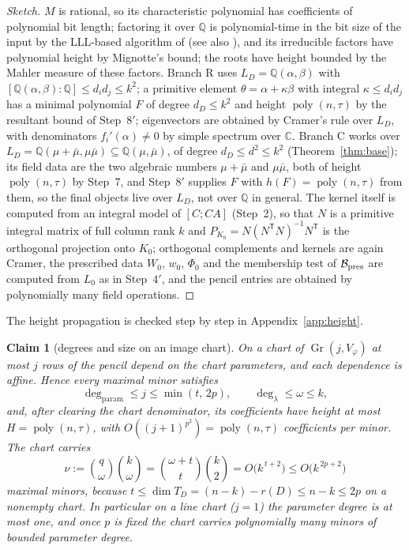 \documentclass[journal]{IEEEtran}
\theoremstyle{plainn}
\newtheorem{claim}[thm]{Claim}
\theoremstyle{remark}
\newcommand{\Gr}{\operatorname{Gr}}
\newcommand{\poly}{\operatorname{poly}}
\begin{document}
\begin{proof}[Sketch]
$M$ is rational, so its characteristic polynomial has coefficients of polynomial bit length; factoring it
over $\mathbb Q$ is polynomial-time in the bit size of the input by the LLL-based algorithm of \cite{lll82}
(see also \cite{cohen93}), and its irreducible factors have polynomial height by Mignotte's bound; the
roots have height bounded by the Mahler measure of these factors. Branch R uses $L_D=\mathbb Q(\alpha,\beta)$ with
$[\mathbb Q(\alpha,\beta):\mathbb Q]\le d_id_j\le k^2$; a primitive element $\theta=\alpha+\kappa\beta$ with integral
$\kappa\le d_id_j$ has a minimal polynomial $F$ of degree $d_D\le k^2$ and height $\poly(n,\tau)$ by the
resultant bound of Step~$8'$; eigenvectors are obtained by Cramer's rule over
$L_D$, with denominators $f_i'(\alpha)\ne0$ by simple spectrum over $\mathbb C$. Branch C works over
$L_D=\mathbb Q(\mu+\bar\mu,\mu\bar\mu)\subseteq\mathbb Q(\mu,\bar\mu)$, of degree $d_D\le d^2\le k^2$
(Theorem~\ref{thm:base}); its field data are the two algebraic numbers $\mu+\bar\mu$ and $\mu\bar\mu$,
both of height $\poly(n,\tau)$ by Step~7, and Step~$8'$ supplies $F$ with $h(F)=\poly(n,\tau)$ from
them, so the final objects live over $L_D$, not over $\mathbb Q$ in general. The kernel itself is
computed from an
integral model of $[C;CA]$ (Step~2), so that $N$ is a primitive integral matrix of full column rank $k$ and
$P_{K_0}=N(N^{\mathsf T}N)^{-1}N^{\mathsf T}$ is the orthogonal projection onto $K_0$; orthogonal
complements and kernels are again Cramer, the prescribed data $W_0$, $w_0$, $\Phi_0$ and the membership test of
$\mathcal B_{\rm pres}$ are computed from $L_0$ as in Step~$4'$, and the pencil entries are obtained by
polynomially many field operations.
\end{proof}

The height propagation is checked step by step in Appendix~\ref{app:height}.

\begin{claim}[degrees and size on an image chart]\label{clm:degrees}
On a chart of $\Gr(j,V_\varphi)$ at most $j$ rows of the pencil depend on the chart parameters, and each
dependence is affine. Hence every maximal minor satisfies
\[
\deg_{\text{param}}\le j\le\min(t,\,2p),\qquad \deg_\lambda\le\omega\le k ,
\]
and, after clearing the chart denominator, its coefficients have height at most $H=\poly(n,\tau)$, with
$O((j+1)^{p^2})=\poly(n,\tau)$ coefficients per minor. The chart carries
\[
\nu:=\binom{q}{\omega}\binom{k}{\omega}
=\binom{\omega+t}{t}\binom{k}{2}=O\bigl(k^{\,t+2}\bigr)\le O\bigl(k^{\,2p+2}\bigr)
\]
maximal minors, because $t\le\dim T_D=(n-k)-r(D)\le n-k\le2p$ on a nonempty chart. In particular on a
line chart ($j=1$) the parameter degree is at most one, and once $p$ is fixed the chart carries
polynomially many minors of bounded parameter degree.
\end{claim}
\end{document}
